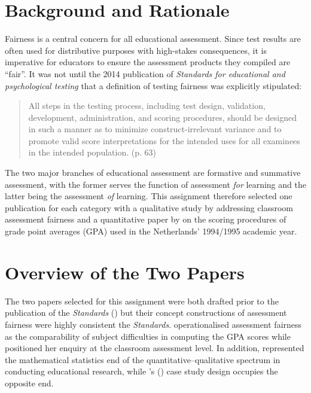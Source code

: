 \documentclass[
    a4paper,            %
    12pt,               %
    stu,                %
    noextraspace,       %
    floatsintext,       %
    biblatex,           %
    colorlinks=true,        %
    linkcolor=red,          %
    anchorcolor=black,      %
    citecolor=blue,         %
    urlcolor=blue,          %
    bookmarks=true,         %
    bookmarksopen=false,    %
    bookmarksnumbered=true  %
    margin=2cm              %
]{apa7}
\newcommand{\poscite}[1]{\citeauthor{#1}'s (\citeyear{#1})}
\newenvironment{qt}{
    \begin{quotation}
        \vspace{-0.5\baselineskip}
}{
        \vspace{-0.5\baselineskip}
    \end{quotation}
}
\begin{document}
\section{Background and Rationale}

Fairness is a central concern for all educational assessment. Since test results are often used for distributive purposes with high-stakes consequences, it is imperative for educators to ensure the assessment products they compiled are ``fair''. It was not until the 2014 publication of \textit{Standards for educational and psychological testing} \parencite[the \textit{Standards},][]{standards:2014} that a definition of testing fairness was explicitly stipulated:
\begin{qt}
    \noindent All steps in the testing process, including test design, validation, development, administration, and scoring procedures, should be designed in such a manner as to minimize construct-irrelevant variance and to promote valid score interpretations for the intended uses for all examinees in the intended population. (p. 63)
\end{qt}

The two major branches of educational assessment are formative and summative assessment, with the former serves the function of assessment \emph{for} learning and the latter being the assessment \emph{of} learning. This assignment therefore selected one publication for each category with a qualitative study by \textcite{tierney:2014} addressing classroom assessment fairness and a quantitative paper by \textcite{korobko:2008} on the scoring procedures of grade point averages (GPA) used in the Netherlands' 1994/1995 academic year.

\section{Overview of the Two Papers}

The two papers selected for this assignment were both drafted prior to the publication of the \textit{Standards} (\citeyear{standards:2014}) but their concept constructions of assessment fairness were highly consistent the \textit{Standards}. \textcite{korobko:2008} operationalised assessment fairness as the comparability of subject difficulties in computing the GPA scores while \textcite{tierney:2014} positioned her enquiry at the classroom assessment level. In addition, \textcite{korobko:2008} represented the mathematical statistics end of the quantitative--qualitative spectrum in conducting educational research, while \poscite{tierney:2014} case study design occupies the opposite end.
\end{document}
